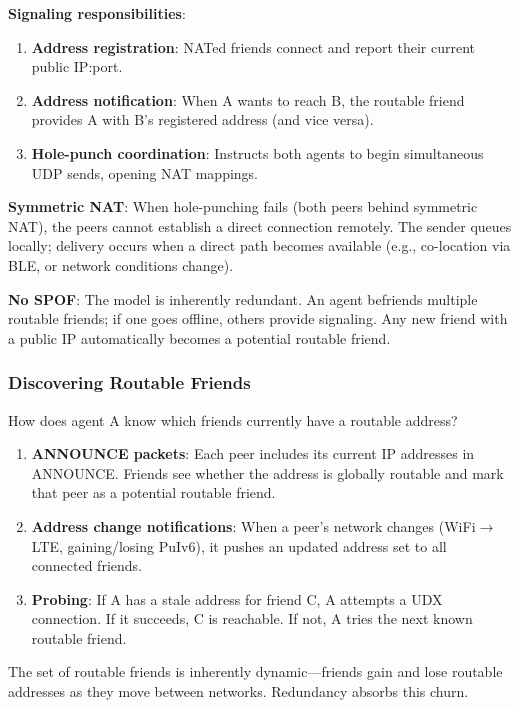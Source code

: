 \documentclass[11pt,a4paper]{article}
\begin{document}
\textbf{Signaling responsibilities}:
\begin{enumerate}[nosep]
  \item \textbf{Address registration}: NATed friends connect and report their current public IP:port.
  \item \textbf{Address notification}: When A wants to reach B, the routable friend provides A with B's registered address (and vice versa).
  \item \textbf{Hole-punch coordination}: Instructs both agents to begin simultaneous UDP sends, opening NAT mappings.
\end{enumerate}

\textbf{Symmetric NAT}: When hole-punching fails (both peers behind symmetric NAT), the peers cannot establish a direct connection remotely. The sender queues locally; delivery occurs when a direct path becomes available (e.g., co-location via BLE, or network conditions change).

\textbf{No SPOF}: The model is inherently redundant. An agent befriends multiple routable friends; if one goes offline, others provide signaling. Any new friend with a public IP automatically becomes a potential routable friend.

\subsubsection{Discovering Routable Friends}

How does agent A know which friends currently have a routable address?

\begin{enumerate}[nosep]
  \item \textbf{ANNOUNCE packets}: Each peer includes its current IP addresses in ANNOUNCE. Friends see whether the address is globally routable and mark that peer as a potential routable friend.
  \item \textbf{Address change notifications}: When a peer's network changes (WiFi$\to$LTE, gaining/losing PuIv6), it pushes an updated address set to all connected friends.
  \item \textbf{Probing}: If A has a stale address for friend C, A attempts a UDX connection. If it succeeds, C is reachable. If not, A tries the next known routable friend.
\end{enumerate}

The set of routable friends is inherently dynamic---friends gain and lose routable addresses as they move between networks. Redundancy absorbs this churn.
\end{document}
